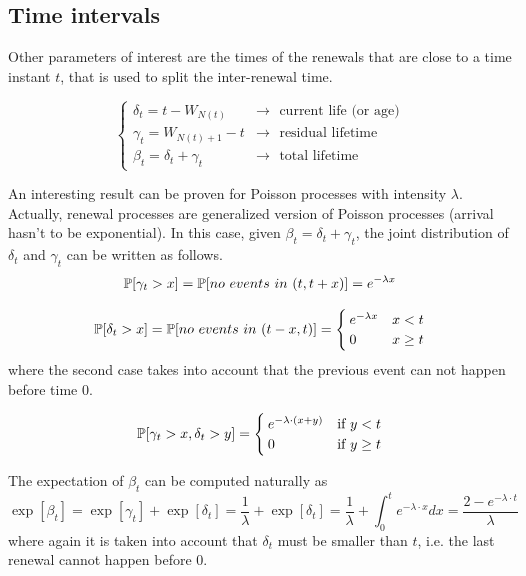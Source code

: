\subsection{Time intervals}
	Other parameters of interest are the times of the renewals that are close to a time instant $t$, that is used to split the inter-renewal time.

	\begin{equation} \begin{cases}
		\delta_t = t - W_{N(t)} & \rightarrow
			\text{~~current life (or age)} \\
		\gamma_t = W_{N(t)+1}-t & \rightarrow
			\text{~~residual lifetime} \\
		\beta_t = \delta_t + \gamma_t & \rightarrow
			\text{~~total lifetime}
	\end{cases} \end{equation}

	\bigbreak
	An interesting result can be proven for Poisson processes with intensity $\lambda$.
	Actually, renewal processes are generalized version of Poisson processes (arrival hasn't to be exponential).
	In this case, given $\beta_t = \delta_t + \gamma_t$, the joint distribution of $\delta_t$ and $\gamma_t$ can be written as follows.
	\begin{equation*}
		\mathbb{P}[\gamma_t > x] = \mathbb{P}[no ~events ~in ~(t,t+x)] = e^{-\lambda x}
	\end{equation*}

	\begin{equation*}
		\mathbb{P}[\delta_t > x] = \mathbb{P}[no ~events ~in ~(t-x,t)] =
		\begin{cases}
			e^{-\lambda x} & x<t\\
			0 & x\ge t
		\end{cases}
	\end{equation*}
	where the second case takes into account that the previous event can not happen before time 0.

	\begin{equation}
		\mathbb{P}[\gamma_t > x, \delta_t > y ] =
		\begin{cases}
			e^{-\lambda \cdot (x+y)} & \text{if } y < t \\
			0 & \text{if } y \ge t \\
		\end{cases}
	\end{equation}

	The expectation of $\beta_t$ can be computed naturally as
	\begin{equation*}
		\exp[\beta_t] = \exp[\gamma_t] + \exp[\delta_t] =
		\frac{1}{\lambda} + \exp[\delta_t] =
		\frac{1}{\lambda} + \int_0^t e^{-\lambda \cdot x} dx =
		\frac{2-e^{-\lambda \cdot t}}{\lambda}
	\end{equation*}
	where again it is taken into account that $\delta_t$ must be smaller than $t$, i.e. the last renewal cannot happen before 0.

